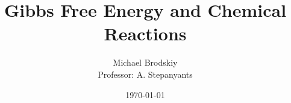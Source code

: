 


\title{Gibbs Free Energy and Chemical Reactions}
\date{\today}
\author{Michael Brodskiy\\ \small Professor: A. Stepanyants}



\maketitle

